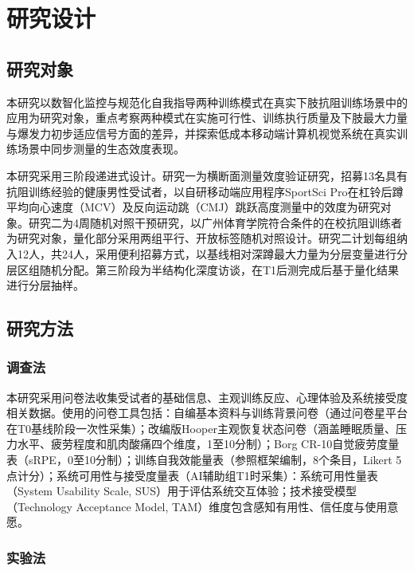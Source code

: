 
\chapter{研究设计}

\section{研究对象}

本研究以数智化监控与规范化自我指导两种训练模式在真实下肢抗阻训练场景中的应用为研究对象，重点考察两种模式在实施可行性、训练执行质量及下肢最大力量与爆发力初步适应信号方面的差异，并探索低成本移动端计算机视觉系统在真实训练场景中同步测量的生态效度表现。

本研究采用三阶段递进式设计。研究一为横断面测量效度验证研究，招募13名具有抗阻训练经验的健康男性受试者，以自研移动端应用程序SportSci Pro在杠铃后蹲平均向心速度（MCV）及反向运动跳（CMJ）跳跃高度测量中的效度为研究对象。研究二为4周随机对照干预研究，以广州体育学院符合条件的在校抗阻训练者为研究对象，量化部分采用两组平行、开放标签随机对照设计。研究二计划每组纳入12人，共24人，采用便利招募方式，以基线相对深蹲最大力量为分层变量进行分层区组随机分配。第三阶段为半结构化深度访谈，在T1后测完成后基于量化结果进行分层抽样。

\section{研究方法}

\subsection{调查法}

本研究采用问卷法收集受试者的基础信息、主观训练反应、心理体验及系统接受度相关数据。使用的问卷工具包括：自编基本资料与训练背景问卷（通过问卷星平台在T0基线阶段一次性采集）；改编版Hooper主观恢复状态问卷（涵盖睡眠质量、压力水平、疲劳程度和肌肉酸痛四个维度，1至10分制）；Borg CR-10自觉疲劳度量表（sRPE，0至10分制）；训练自我效能量表（参照\citep{Bandura1997}框架编制，8个条目，Likert 5点计分）；系统可用性与接受度量表（AI辅助组T1时采集）：系统可用性量表（System Usability Scale, SUS）用于评估系统交互体验；技术接受模型（Technology Acceptance Model, TAM）维度包含感知有用性、信任度与使用意愿。

\subsection{实验法}

